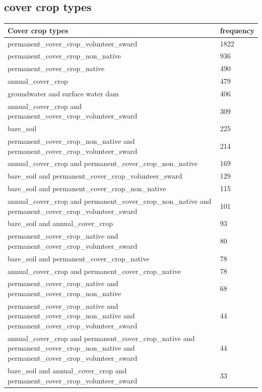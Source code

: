 \documentclass[review,12pt,authoryear]{elsarticle}
\begin{document}
\begin{linenumbers}
\subsection{cover crop types}
\begin{table}[]
  \begin{tabular}{@{}ll@{}}
  \toprule
  Cover crop types & frequency \\ \midrule
  permanent_cover_crop_volunteer_sward & 1822 \\
  permanent_cover_crop_non_native & 936 \\
  permanent_cover_crop_native & 490 \\
  annual_cover_crop & 479 \\
  groundwater and surface water dam & 406 \\
  annual_cover_crop and permanent_cover_crop_volunteer_sward & 309 \\
  bare_soil & 225 \\
  permanent_cover_crop_non_native and permanent_cover_crop_volunteer_sward & 214 \\
  annual_cover_crop and permanent_cover_crop_non_native & 169 \\
  bare_soil and permanent_cover_crop_volunteer_sward & 129 \\
  bare_soil and permanent_cover_crop_non_native & 115 \\
  annual_cover_crop and permanent_cover_crop_non_native and permanent_cover_crop_volunteer_sward & 101 \\
  bare_soil and annual_cover_crop & 93 \\
  permanent_cover_crop_native and permanent_cover_crop_volunteer_sward & 80 \\
  bare_soil and permanent_cover_crop_native & 78 \\
  annual_cover_crop and permanent_cover_crop_native & 78 \\
  permanent_cover_crop_native and permanent_cover_crop_non_native & 68 \\
  permanent_cover_crop_native and permanent_cover_crop_non_native and permanent_cover_crop_volunteer_sward & 44 \\
  annual_cover_crop and permanent_cover_crop_native and permanent_cover_crop_non_native and permanent_cover_crop_volunteer_sward & 44 \\
  bare_soil and annual_cover_crop and permanent_cover_crop_volunteer_sward & 33 \\

\end{tabular}
\end{table}
\end{linenumbers}
\end{document}
